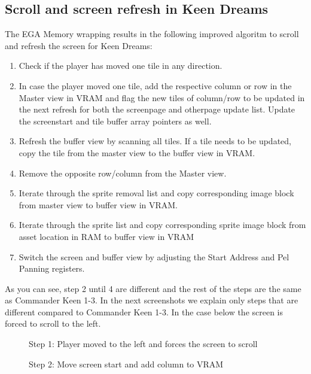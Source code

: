 \documentclass[book.tex]{subfiles}
\begin{document}
\subsection{Scroll and screen refresh in Keen Dreams} \label{section:scroll_refresh_dreams}

The EGA Memory wrapping results in the following improved algoritm to scroll and refresh the screen for Keen Dreams:
\begin{enumerate}
\item Check if the player has moved one tile in any direction.
\item In case the player moved one tile, add the respective column or row in the Master view in VRAM and flag the new tiles of column/row to be updated in the next refresh for both the screenpage and otherpage update list. Update the screenstart and tile buffer array pointers as well.
\item Refresh the buffer view by scanning all tiles. If a tile needs to be updated, copy the tile from the master view to the buffer view in VRAM.
\item Remove the opposite row/column from the Master view.
\item Iterate through the sprite removal list and copy corresponding image block from master view to buffer view in VRAM. 
\item Iterate through the sprite list and copy corresponding sprite image block from asset location in RAM to buffer view in VRAM
\item Switch the screen and buffer view by adjusting the Start Address and Pel Panning registers.
\end{enumerate}

As you can see, step 2 until 4 are different and the rest of the steps are the same as Commander Keen 1-3. In the next screenshots we explain only steps that are different compared to Commander Keen 1-3. In the case below the screen is forced to scroll to the left.
\\

\begin{figure}[H]
\centering
 \caption{Step 1: Player moved to the left and forces the screen to scroll}
 \label{fig:kc4_6_start}
\end{figure}

\begin{figure}[H]
\centering
 \caption{Step 2: Move screen start and add column to VRAM}
 \label{fig:kc4_6_add_column}
\end{figure}
\end{document}
